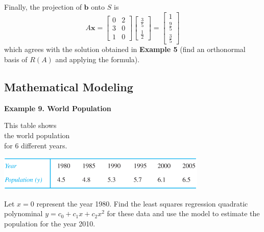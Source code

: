 \documentclass{article}
\newcommand\B{\textbf}
\begin{document}
    Finally, the projection of $\B{b}$ onto $S$ is
    \[A\B{x} = \begin{bmatrix}
        0 & 2 \\
        3 & 0 \\
        1 & 0
    \end{bmatrix} 
    \begin{bmatrix}
        \frac{3}{5} \\
        \frac{1}{2}
    \end{bmatrix} =
    \begin{bmatrix}
        1 \\
        \frac{9}{5} \\
        \frac{3}{5}
    \end{bmatrix} \]
    which agrees with the solution obtained in \B{Example 5} (find an orthonormal basis of $R(A)$ 
    and applying the formula).

    \subsection{Mathematical Modeling}

    \B{Example 9. \textcolor{blue5}{World Population}}

    \begin{minipage}{0.3\linewidth}
    This table shows \\
    the world population\\
    for 6 different years.     
    \end{minipage}
    \begin{minipage}{0.65\linewidth}
       \includegraphics[width = 10cm]{images/population.png}
    \end{minipage}

    Let $x = 0$ represent the year 1980. Find the least squares regression quadratic polynominal
    $y = c_0 + c_1x + c_2x^2$ for these data and use the model to estimate the population for the year 2010.
\end{document}
